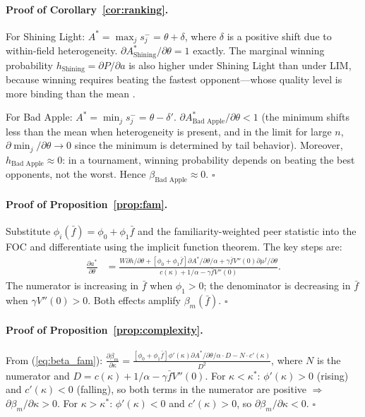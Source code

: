 \documentclass[12pt]{article}
\theoremstyle{definition}
\theoremstyle{remark}
\begin{document}
\paragraph{Proof of Corollary~\ref{cor:ranking}.}

For Shining Light: $A^* = \max_j s_j^- = \theta + \delta$, where $\delta$ is a
positive shift due to within-field heterogeneity.
$\partial A_{\text{Shining}}^*/\partial\theta = 1$ exactly.
The marginal winning probability $h_{\text{Shining}} = \partial P/\partial a$ is also higher
under Shining Light than under LIM, because winning requires beating the fastest
opponent---whose quality level is more binding than the mean \citep{LazearRosen1981}.

For Bad Apple: $A^* = \min_j s_j^- = \theta - \delta'$.
$\partial A_{\text{Bad Apple}}^*/\partial\theta < 1$ (the minimum shifts less than the mean
when heterogeneity is present, and in the limit for large $n$,
$\partial \min_j / \partial\theta \to 0$ since the minimum is determined
by tail behavior).
Moreover, $h_{\text{Bad Apple}} \approx 0$: in a tournament, winning probability
depends on beating the best opponents, not the worst.
Hence $\beta_{\text{Bad Apple}} \approx 0$.
$\square$

\paragraph{Proof of Proposition~\ref{prop:fam}.}

Substitute $\phi_i(\bar{f}) = \phi_0 + \phi_1 \bar{f}$ and the familiarity-weighted
peer statistic into the FOC and differentiate using the implicit function theorem.
The key steps are:
\begin{align*}
\frac{\partial a^*}{\partial\theta} &=
\frac{W\partial h/\partial\theta + [\phi_0+\phi_1\bar{f}]\partial A^*/\partial\theta/\alpha
+ \gamma\bar{f} V''(0)\partial\mu^f/\partial\theta}
{c(\kappa)+1/\alpha - \gamma\bar{f} V''(0)}.
\end{align*}
The numerator is increasing in $\bar{f}$ when $\phi_1 > 0$;
the denominator is decreasing in $\bar{f}$ when $\gamma V''(0) > 0$.
Both effects amplify $\beta_m(\bar{f})$.
$\square$

\paragraph{Proof of Proposition~\ref{prop:complexity}.}

From (\ref{eq:beta_fam}):
$\frac{\partial\beta_m}{\partial\kappa}
= \frac{[\phi_0+\phi_1\bar{f}]\phi'(\kappa)\partial A^*/\partial\theta/\alpha \cdot D
- N \cdot c'(\kappa)}{D^2}$,
where $N$ is the numerator and $D = c(\kappa)+1/\alpha-\gamma\bar{f} V''(0)$.
For $\kappa < \kappa^*$: $\phi'(\kappa) > 0$ (rising) and $c'(\kappa) < 0$ (falling),
so both terms in the numerator are positive $\Rightarrow$ $\partial\beta_m/\partial\kappa > 0$.
For $\kappa > \kappa^*$: $\phi'(\kappa) < 0$ and $c'(\kappa) > 0$, so
$\partial\beta_m/\partial\kappa < 0$.
$\square$
\end{document}
